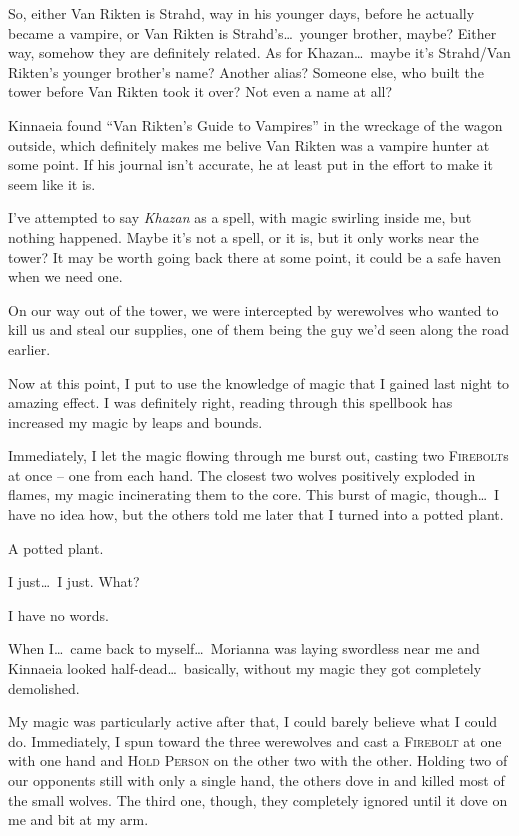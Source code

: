 So, either Van Rikten is Strahd, way in his younger days, before he actually became a vampire, or Van Rikten is Strahd's\dots\ younger brother, maybe? Either way, somehow they are definitely related. As for Khazan\dots\ maybe it's Strahd/Van Rikten's younger brother's name? Another alias? Someone else, who built the tower before Van Rikten took it over? Not even a name at all?

Kinnaeia found ``Van Rikten's Guide to Vampires'' in the wreckage of the wagon outside, which definitely makes me belive Van Rikten was a vampire hunter at some point. If his journal isn't accurate, he at least put in the effort to make it seem like it is.

I've attempted to say \emph{Khazan} as a spell, with magic swirling inside me, but nothing happened. Maybe it's not a spell, or it is, but it only works near the tower? It may be worth going back there at some point, it could be a safe haven when we need one.

On our way out of the tower, we were intercepted by werewolves who wanted to kill us and steal our supplies, one of them being the guy we'd seen along the road earlier.

Now at this point, I put to use the knowledge of magic that I gained last night to amazing effect. I was definitely right, reading through this spellbook has increased my magic by leaps and bounds.

Immediately, I let the magic flowing through me burst out, casting two \textsc{Firebolt}s at once -- one from each hand. The closest two wolves positively exploded in flames, my magic incinerating them to the core. This burst of magic, though\dots\ I have no idea how, but the others told me later that I turned into a potted plant.

A potted plant.

I just\dots\ I just. What?

I have no words.

When I\dots\ came back to myself\dots\ Morianna was laying swordless near me and Kinnaeia looked half-dead\dots\ basically, without my magic they got completely demolished.

My magic was particularly active after that, I could barely believe what I could do. Immediately, I spun toward the three werewolves and cast a \textsc{Firebolt} at one with one hand and \textsc{Hold Person} on the other two with the other. Holding two of our opponents still with only a single hand, the others dove in and killed most of the small wolves. The third one, though, they completely ignored until it dove on me and bit at my arm.

